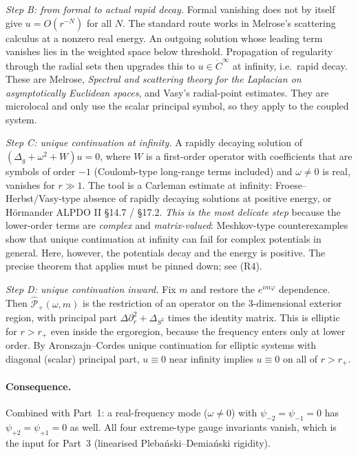 \documentclass[11pt]{article}
\theoremstyle{remark}\newtheorem{remark}{Remark}
\begin{document}
\emph{Step B: from formal to actual rapid decay.}
Formal vanishing does not by itself give $u=O(r^{-N})$ for all $N$. The standard route works in Melrose's scattering calculus at a nonzero real energy. An outgoing solution whose leading term vanishes lies in the weighted space below threshold. Propagation of regularity through the radial sets then upgrades this to $u\in\dot C^\infty$ at infinity, i.e.\ rapid decay. These are Melrose, \emph{Spectral and scattering theory for the Laplacian on asymptotically Euclidean spaces}, and Vasy's radial-point estimates. They are microlocal and only use the scalar principal symbol, so they apply to the coupled system.

\emph{Step C: unique continuation at infinity.}
A rapidly decaying solution of $(\Delta_g+\omega^2+W)u=0$, where $W$ is a first-order operator with coefficients that are symbols of order $-1$ (Coulomb-type long-range terms included) and $\omega\neq0$ is real, vanishes for $r\gg1$. The tool is a Carleman estimate at infinity: Froese--Herbst/Vasy-type absence of rapidly decaying solutions at positive energy, or Hörmander ALPDO II \S14.7 / \S17.2.
\emph{This is the most delicate step} because the lower-order terms are \emph{complex} and \emph{matrix-valued}: Meshkov-type counterexamples show that unique continuation at infinity can fail for complex potentials in general. Here, however, the potentials decay and the energy is positive. The precise theorem that applies must be pinned down; see (R4).

\emph{Step D: unique continuation inward.}
Fix $m$ and restore the $e^{im\varphi}$ dependence. Then $\widehat{\mathcal P}_+(\omega,m)$ is the restriction of an operator on the 3-dimensional exterior region, with principal part $\Delta\partial_r^2+\Delta_{S^2}$ times the identity matrix. This is elliptic for $r>r_+$ even inside the ergoregion, because the frequency enters only at lower order. By Aronszajn--Cordes unique continuation for elliptic systems with diagonal (scalar) principal part, $u\equiv0$ near infinity implies $u\equiv0$ on all of $r>r_+$.

\paragraph{Consequence.} Combined with Part~1: a real-frequency mode ($\omega\neq0$) with $\psi_{-2}=\psi_{-1}=0$ has $\psi_{+2}=\psi_{+1}=0$ as well. All four extreme-type gauge invariants vanish, which is the input for Part~3 (linearised Plebański--Demiański rigidity).
\end{document}
